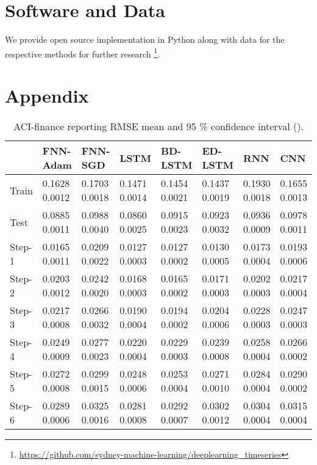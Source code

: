 \documentclass{ieeeaccess}
\begin{document}
 \section*{Software and Data}
We provide open source implementation in Python along with data for the respective methods  for further research \footnote{\url{https://github.com/sydney-machine-learning/deeplearning_timeseries}}.
 
 
\section*{Appendix}








\begin{table*}[htbp]
 \smaller 
 \caption{ACI-finance reporting RMSE mean and 95 \% confidence interval   ().}
\label{tab:finance}
\begin{tabular}{llllllll}
\hline
 &  FNN-Adam& FNN-SGD & LSTM & BD-LSTM  & ED-LSTM & RNN & CNN\\
\hline
\hline
Train &  0.1628   0.0012 & 0.1703    0.0018  & 0.1471    0.0014  &  0.1454   0.0021 &  0.1437   0.0019  &  0.1930   0.0018   & 0.1655	0.0013\\
 Test &   0.0885   0.0011 & 0.0988    0.0040  & 0.0860    0.0025  &  0.0915   0.0023 & 0.0923   0.0032  & 0.0936   0.0009 & 0.0978	0.0011\\
Step-1 &  0.0165   0.0011 & 0.0209   0.0022  & 0.0127   0.0003  &  0.0127  0.0002 &  0.0130   0.0005  &  0.0173   0.0004  & 0.0193	0.0006\\
Step-2 &  0.0203   0.0012 & 0.0242    0.0020  & 0.0168    0.0003  &  0.0165   0.0002 &  0.0171   0.0003  &  0.0202   0.0003   &0.0217	0.0004\\
Step-3 &  0.0217   0.0008 & 0.0266    0.0032  & 0.0190    0.0004  &  0.0194   0.0002 &  0.0204   0.0006  &  0.0228   0.0003 & 0.0247	0.0003 \\
Step-4 &  0.0249  0.0009 & 0.0277    0.0023  & 0.0220   0.0004  &  0.0229   0.0003 & 0.0239   0.0008  &  0.0258   0.0004  &0.0266	0.0002 \\


Step-5 &  0.0272   0.0008 & 0.0299    0.0015  & 0.0248    0.0006  &  0.0253   0.0004 &  0.0271  0.0010  &  0.0284  0.0004 & 0.0290	0.0002 \\

Step-6 &  0.0289  0.0006 & 0.0325    0.0016  & 0.0281   0.0008 & 0.0292   0.0007 &  0.0302   0.0012  &  0.0304   0.0004 & 0.0315	0.0004 \\


\end{tabular}
\end{table*}
\end{document}
